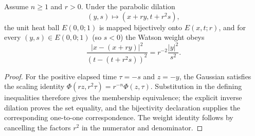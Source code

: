 %
%

\begin{lemma}
\label{lem:heat-ball-parabolic-scaling}


Assume $n \geq 1$ and $r>0$. Under the parabolic dilation
\[
(y,s) \longmapsto (x+ry,t+r^2s),
\]
the unit heat ball $E(0,0;1)$ is mapped bijectively onto $E(x,t;r)$, and for
every $(y,s) \in E(0,0;1)$ (so $s<0$) the Watson weight obeys
\[
\frac{|x-(x+ry)|^2}{(t-(t+r^2s))^2}
 = r^{-2}\frac{|y|^2}{s^2}.
\]
\end{lemma}
\begin{proof}

For the positive elapsed time $\tau=-s$ and $z=-y$, the Gaussian satisfies the
scaling identity $\Phi(rz,r^2\tau)=r^{-n}\Phi(z,\tau)$. Substitution in the defining
inequalities therefore gives the membership equivalence; the explicit inverse
dilation proves the set equality, and the bijectivity declaration supplies the
corresponding one-to-one correspondence. The weight identity follows by
cancelling the factors $r^2$ in the numerator and denominator.
\end{proof}

